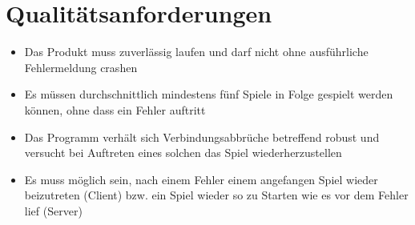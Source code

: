 \documentclass[a4paper,10pt]{article}
\begin{document}
\section{Qualitätsanforderungen}
\begin{itemize}
\item Das Produkt muss zuverlässig laufen und darf nicht ohne ausführliche Fehlermeldung crashen
\item Es müssen durchschnittlich mindestens fünf Spiele in Folge gespielt werden können, ohne dass ein Fehler auftritt
\item Das Programm verhält sich Verbindungsabbrüche betreffend robust und versucht bei Auftreten eines solchen das Spiel wiederherzustellen 
\item Es muss möglich sein, nach einem Fehler einem angefangen Spiel wieder beizutreten (Client) bzw. ein Spiel wieder so zu Starten wie es vor dem Fehler lief (Server)
\end{itemize}
\newpage
\end{document}
